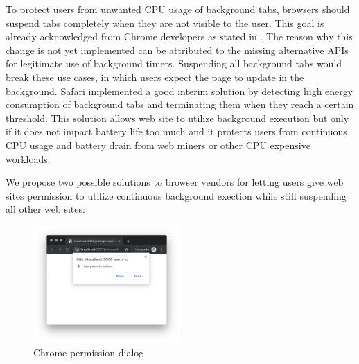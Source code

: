 \documentclass[
	ruledheaders=section,%
	class=report,%
	thesis={type=bachelor},%
	accentcolor=9c,%
	custommargins=true,%
	marginpar=false,%
	parskip=half-,%
	fontsize=11pt,%
]{tudapub}
\begin{document}
  To protect users from unwanted CPU usage of background tabs, browsers should suspend tabs completely when they are not visible to the user. This goal is already acknowledged from Chrome developers as stated in \cite{chrome-background-tabs-roadmap}. The reason why this change is not yet implemented can be attributed to the missing alternative APIs for legitimate use of background timers. Suspending all background tabs would break these use cases, in which users expect the page to update in the background. Safari implemented a good interim solution by detecting high energy consumption of background tabs and terminating them when they reach a certain threshold. This solution allows web site to utilize background execution but only if it does not impact battery life too much and it protects users from continuous CPU usage and battery drain from web miners or other CPU expensive workloads.

  We propose two possible solutions to browser vendors for letting users give web sites permission to utilize continuous background exection while still suspending all other web sites:

  \begin{figure}
    \centering
    \includegraphics[width=0.5\textwidth]{images/microphone-permission.png}
    \caption{Chrome permission dialog}
    \label{fig:chrome-permission-dialog}
  \end{figure}
\end{document}
